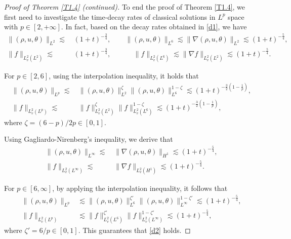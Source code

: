 \documentclass[10pt,a4paper]{amsart}
\begin{document}
\begin{proof}[Proof of Theorem \ref{T1.4} \emph{(}continued\emph{)}]
To end the proof of  Theorem \ref{T1.4},  we first need to investigate  
the  time-decay rates of classical solutions in $L^p$ space with  $p\in [2,+\infty]$. In fact, 
based on the decay rates obtained in   \eqref{d1}, we have 
\begin{align*}
\|(\rho,u,\theta)\|_{L^2}\lesssim \,& (1+t)^{-\frac{3}{4}}, \qquad
 \|(\rho,u,\theta)\|_{L^6}\lesssim   \|\nabla(\rho,u,\theta)\|_{L^2}\lesssim (1+t)^{-\frac{5}{4}},   \\
 \|f\|_{L_v^2(L^{2})}\lesssim \,&  (1+t)^{-\frac{3}{4}},\qquad\quad\, 
 \| f\|_{L_v^2(L^{6})}\lesssim    \|\nabla f\|_{L_v^2(L^{2})}\lesssim (1+t)^{-\frac{5}{4}}.      
\end{align*}

For $p\in [2,6]$, using the interpolation inequality, it holds that
\begin{align*}
 \|(\rho,u,\theta)\|_{L^p}\lesssim \,
 &  \|(\rho,u,\theta)\|_{L^2}^{\zeta}\|(\rho,u,\theta)\|_{L^6}^{{1-\zeta}}
 \lesssim  (1+t)^{-\frac{3}{2}(1-\frac{1}{p})} , \\
 \|f\|_{L_v^2(L^{p})}\lesssim \,&  
 \|f\|_{L_v^2(L^{2})}^{\zeta}\|f\|_{L_v^2(L^{6})}^{{1-\zeta}}\lesssim  (1+t)^{-\frac{3}{2}(1-\frac{1}{p})},
\end{align*}
where $\zeta= ({6-p})/ {2p} \in [0,1]$.

Using   Gagliardo-Nirenberg's inequality, we derive  that
\begin{align*} 
\|(\rho,u,\theta)\|_{L^{\infty}} \lesssim \,& \|\nabla(\rho,u,\theta)\|_{H^{1}} 
\lesssim (1+t)^{-\frac{5}{4}}, \\ 
\|f\|_{L_v^2(L^{\infty})} \lesssim \,& \|\nabla f\|_{L_v^2(H^{1})} 
\lesssim (1+t)^{-\frac{5}{4}}. 
\end{align*}  

For $p \in [6,\infty]$, by applying the interpolation inequality, it follows that  
\begin{align*} 
\|(\rho,u,\theta)\|_{L^p} &\lesssim \|(\rho,u,\theta)\|_{L^6}^{\zeta'} 
\|(\rho,u,\theta)\|_{L^{\infty}}^{1-\zeta'} \lesssim (1+t)^{-\frac{5}{4}}, \\ 
\|f\|_{L_v^2(L ^{p})} &\lesssim \|f\|_{L_v^2(L ^{6})}^{\zeta'} 
\|f\|_{L_v^2(L ^{\infty})}^{1-\zeta'} \lesssim (1+t)^{-\frac{5}{4}}, 
\end{align*}  
where $\zeta' = {6}/{p} \in [0,1]$. This guarantees that \eqref{d2} holds.


\end{proof}
\end{document}
